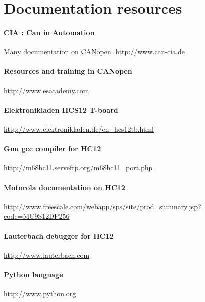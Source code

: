 \documentclass[a4paper,12pt]{book}
\begin{document}
\section{Documentation resources\newline}
\paragraph{CIA : Can in Automation\newline}
Many documentation on CANopen.\newline
\href{http://www.can-cia.de/}{http://www.can{}-cia.de}

\paragraph{Resources and training in CANopen\newline}
\href{http://www.esacademy.com/}{http://www.esacademy.com}

\paragraph{Elektronikladen HCS12 T{}-board\newline}
\href{http://www.elektronikladen.de/en_hcs12tb.html}{http://www.elektronikladen.de/en\_hcs12tb.html}

\paragraph{Gnu gcc compiler for HC12\newline}
\href{http://m68hc11.serveftp.org/m68hc11_port.php}{http://m68hc11.serveftp.org/m68hc11\_port.php}

\paragraph{Motorola documentation on HC12\newline}
\href{http://www.freescale.com/webapp/sps/site/prod_summary.jsp?code=MC9S12DP256}{http://www.freescale.com/webapp/sps/site/prod\_summary.jsp?code=MC9S12DP256}

\paragraph{Lauterbach debugger for HC12\newline}
\href{http://www.lauterbach.com/}{http://www.lauterbach.com}

\paragraph{Python language\newline}
\href{http://www.python.org/}{http://www.python.org}
\end{document}
